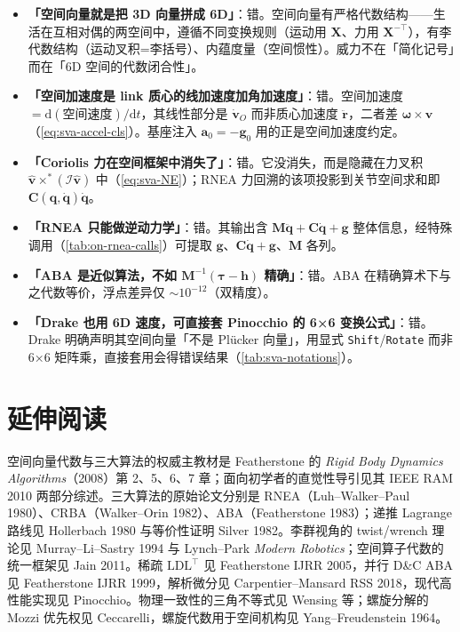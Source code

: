 \begin{itemize}
  \item \textbf{「空间向量就是把 3D 向量拼成 6D」}：错。空间向量有严格代数结构——生活在互相对偶的两空间中，遵循不同变换规则（运动用 $\mathbf X$、力用 $\mathbf X^{-\top}$），有李代数结构（运动叉积=李括号）、内蕴度量（空间惯性）。威力不在「简化记号」而在「6D 空间的代数闭合性」。
  \item \textbf{「空间加速度是 link 质心的线加速度加角加速度」}：错。空间加速度 $=\mathrm d(\text{空间速度})/\mathrm dt$，其线性部分是 $\dot{\mathbf v}_O$ 而非质心加速度 $\ddot{\mathbf r}$，二者差 $\boldsymbol\omega\times\mathbf v$（\cref{eq:sva-accel-cls}）。基座注入 $\mathbf a_0=-\mathbf g_0$ 用的正是空间加速度约定。
  \item \textbf{「Coriolis 力在空间框架中消失了」}：错。它没消失，而是隐藏在力叉积 $\hat{\mathbf v}\times^*(\mathcal I\hat{\mathbf v})$ 中（\cref{eq:sva-NE}）；RNEA 力回溯的该项投影到关节空间求和即 $\mathbf C(\mathbf q,\dot{\mathbf q})\dot{\mathbf q}$。
  \item \textbf{「RNEA 只能做逆动力学」}：错。其输出含 $\mathbf M\ddot{\mathbf q}+\mathbf C\dot{\mathbf q}+\mathbf g$ 整体信息，经特殊调用（\cref{tab:on-rnea-calls}）可提取 $\mathbf g$、$\mathbf C\dot{\mathbf q}+\mathbf g$、$\mathbf M$ 各列。
  \item \textbf{「ABA 是近似算法，不如 $\mathbf M^{-1}(\boldsymbol\tau-\mathbf h)$ 精确」}：错。ABA 在精确算术下与之代数等价，浮点差异仅 $\sim10^{-12}$（双精度）。
  \item \textbf{「Drake 也用 6D 速度，可直接套 Pinocchio 的 6×6 变换公式」}：错。Drake 明确声明其空间向量「不是 Plücker 向量」，用显式 \texttt{Shift}/\allowbreak\texttt{Rotate} 而非 6×6 矩阵乘，直接套用会得错误结果（\cref{tab:sva-notations}）。
\end{itemize}

\section*{延伸阅读}

空间向量代数与三大算法的权威主教材是 Featherstone 的 \emph{Rigid Body Dynamics Algorithms}（2008）第 2、5、6、7 章\cite{featherstone2008rigid}；面向初学者的直觉性导引见其 IEEE RAM 2010 两部分综述\cite{featherstone2010beginner}。三大算法的原始论文分别是 RNEA（Luh--Walker--Paul 1980\cite{luh1980online}）、CRBA（Walker--Orin 1982）、ABA（Featherstone 1983\cite{featherstone1983calculation}）；递推 Lagrange 路线见 Hollerbach 1980\cite{hollerbach1980recursive} 与等价性证明 Silver 1982\cite{silver1982equivalence}。李群视角的 twist/wrench 理论见 Murray--Li--Sastry 1994\cite{murray1994mathematical} 与 Lynch--Park \emph{Modern Robotics}\cite{lynch2017modern}；空间算子代数的统一框架见 Jain 2011\cite{jain2011robot}。稀疏 $\mathrm{LDL}^\top$ 见 Featherstone IJRR 2005\cite{featherstone2005empirical}，并行 D\&C ABA 见 Featherstone IJRR 1999\cite{featherstone1999divide}，解析微分见 Carpentier--Mansard RSS 2018\cite{carpentier2018analytical}，现代高性能实现见 Pinocchio\cite{carpentier2019pinocchio}。物理一致性的三角不等式见 Wensing 等\cite{wensing2018linear}；螺旋分解的 Mozzi 优先权见 Ceccarelli\cite{ceccarelli2000screw}，螺旋代数用于空间机构见 Yang--Freudenstein 1964\cite{yang1964application}。
